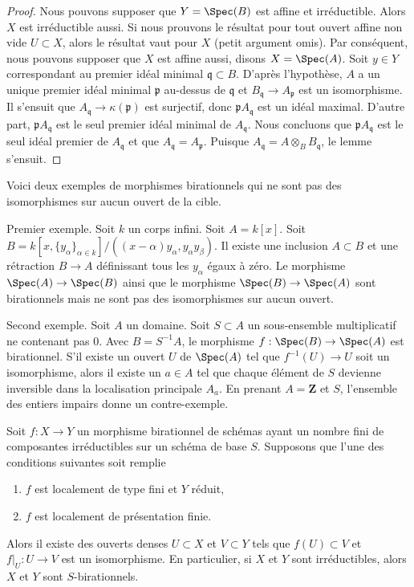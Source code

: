 \begin{proof}
Nous pouvons supposer que $Y = \Spec(B)$ est affine et irréductible.
Alors $X$ est irréductible aussi. Si nous prouvons
le résultat pour tout ouvert affine non vide $U \subset X$,
alors le résultat vaut pour $X$ (petit argument
omis). Par conséquent, nous
pouvons supposer que $X$ est affine aussi, disons $X = \Spec(A)$.
Soit $y \in Y$ correspondant au premier idéal minimal $\mathfrak q \subset B$.
D'après l'hypothèse, $A$ a un unique premier idéal minimal $\mathfrak p$
au-dessus de $\mathfrak q$ et $B_\mathfrak q \to A_\mathfrak p$ est un isomorphisme. Il
s'ensuit que $A_\mathfrak q \to \kappa(\mathfrak p)$ est surjectif, donc $\mathfrak p A_\mathfrak q$ est un idéal maximal.
D'autre part, $\mathfrak p A_\mathfrak q$ est le seul premier idéal minimal de $A_\mathfrak q$.
Nous concluons que $\mathfrak p A_\mathfrak q$ est le seul idéal premier de
$A_\mathfrak q$ et que $A_\mathfrak q = A_\mathfrak p$. Puisque
$A_\mathfrak q = A \otimes_B B_\mathfrak q$, le lemme s'ensuit.
\end{proof}

\begin{example}
\label{example-birational-not-iso-over-open}
Voici deux exemples de morphismes birationnels qui ne sont pas des isomorphismes
sur aucun ouvert de la cible.

\medskip\noindent
Premier exemple. Soit $k$ un corps infini. Soit
$A = k[x]$. Soit $B = k[x, \{y_{\alpha}\}_{\alpha \in k}]/
((x-\alpha)y_\alpha, y_\alpha y_\beta)$. Il existe
une inclusion $A \subset B$ et une rétraction $B \to A$ définissant tous les $y_\alpha$
égaux à zéro. Le morphisme $\Spec(A) \to \Spec(B)$
ainsi que le morphisme $\Spec(B) \to \Spec(A)$
sont birationnels mais ne sont pas des
isomorphismes sur aucun ouvert.

\medskip\noindent Second
exemple. Soit $A$ un domaine. Soit $S \subset A$ un sous-ensemble multiplicatif
ne contenant pas
$0$. Avec $B = S^{-1}A$, le morphisme $f : \Spec(B) \to \Spec(A)$ est birationnel.
S'il existe un ouvert $U$ de $\Spec(A)$ tel
que $f^{-1}(U) \to U$ soit un isomorphisme, alors il existe un $a \in A$ tel
que chaque élément de $S$ devienne inversible dans la localisation
principale $A_a$. En prenant $A = \mathbf{Z}$ et $S$,
l'ensemble des entiers impairs donne un contre-exemple.
\end{example}

\begin{lemma}
\label{lemma-birational-birational}
Soit $f : X \to Y$ un morphisme birationnel de schémas ayant un nombre fini de composantes
irréductibles sur un schéma de base $S$. Supposons que l'une des
conditions suivantes soit remplie
\begin{enumerate}
\item $f$ est localement de type fini et $Y$ réduit,
\item $f$ est localement de présentation finie.
\end{enumerate}
Alors il existe des ouverts denses $U \subset X$ et $V \subset Y$ tels que $f(U) \subset V$
et $f|_U : U \to V$ est un isomorphisme. En particulier, si $X$ et
$Y$ sont irréductibles, alors $X$ et $Y$
sont $S$-birationnels.
\end{lemma}

